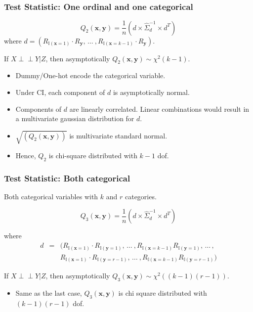 \documentclass{beamer}
\def\ci{\perp\!\!\!\!\!\perp}
\begin{document}
\begin{frame}
	\frametitle{Test Statistic: One ordinal and one categorical}
	$$ Q_2(\bm{x}, \bm{y}) = \frac{1}{n} (d \times \hat{\Sigma}_d^{-1} \times d^T) $$
	where $ d = (R_{\mathbb{I}(\mathbf{x}=1)} \cdot R_{\mathbf{y}}, \, \ldots \ ,
		R_{\mathbb{I}(\mathbf{x}=k-1)} \cdot R_{\mathbf{y}})$.

	\vspace{1em}
	If $ X \ci Y | Z $, then asymptotically $ Q_2(\bm{x}, \bm{y}) \sim \chi^2(k-1) $.

	\begin{itemize}
		\setlength\itemsep{1em}
		\item Dummy/One-hot encode the categorical variable.
		\item Under CI, each component of $ d $ is asymptotically normal.
		\item Components of $ d $ are linearly correlated. Linear combinations
			would result in a multivariate gaussian distribution for $ d $.
		\item $ \sqrt{(Q_2(\bm{x}, \bm{y}))} $ is multivariate standard normal.
		\item Hence, $ Q_2 $ is chi-square distributed with $ k-1 $ dof.
	\end{itemize}
\end{frame}

\begin{frame}
	\frametitle{Test Statistic: Both categorical}
	Both categorical variables with $ k $ and $ r $ categories.


	$$ Q_3(\bm{x}, \bm{y}) = \frac{1}{n} (d \times \hat{\Sigma}_d^{-1} \times d^T) $$

	where 
	\begin{eqnarray*}
		d &  =  & (R_{\mathbb{I}(\mathbf{x}=1)} \cdot R_{\mathbb{I}(\mathbf{y}=1)}, \, \ldots \ ,
		R_{\mathbb{I}(\mathbf{x}=k-1)} R_{\mathbb{I}(\mathbf{y}=1)}, \, \ldots \, ,
		\\
	 	& & R_{\mathbb{I}(\mathbf{x}=1)} \cdot R_{\mathbb{I}(\mathbf{y}=r-1)}, \, \ldots \ ,
		R_{\mathbb{I}(\mathbf{x}=k-1)} R_{\mathbb{I}(\mathbf{y}=r-1)}
		)
	\end{eqnarray*}
	\vspace{1em}

	If $ X \ci Y | Z $, then asymptotically $ Q_3(\bm{x}, \bm{y}) \sim \chi^2((k-1)(r-1)) $.

	\begin{itemize}
		\setlength\itemsep{1em}
		\item Same as the last case, $ Q_3(\bm{x}, \bm{y}) $ is chi square distributed 
			with $ (k-1)(r-1) $ dof.
	\end{itemize}
\end{frame}
\end{document}
